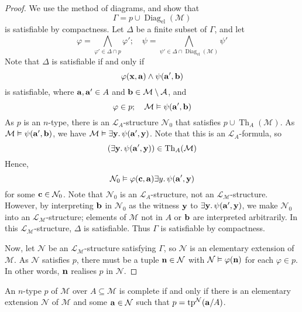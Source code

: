 \begin{proof}
    We use the method of diagrams, and show that
    \[ \Gamma = p \cup \operatorname{Diag}_{\text{el}}(\mathcal M) \]
    is satisfiable by compactness.
    Let \( \Delta \) be a finite subset of \( \Gamma \), and let
    \[ \varphi = \bigwedge_{\varphi' \in \Delta \cap p} \varphi';\quad \psi = \bigwedge_{\psi' \in \Delta \cap \operatorname{Diag}_{\text{el}}(\mathcal M)} \psi' \]
    Note that \( \Delta \) is satisfiable if and only if
    \[ \varphi(\vb x, \vb a) \wedge \psi(\vb a', \vb b) \]
    is satisfiable, where \( \vb a, \vb a' \in A \) and \( \vb b \in \mathcal M \setminus \mathcal A \), and
    \[ \varphi \in p;\quad \mathcal M \vDash \psi(\vb a', \vb b) \]
    As \( p \) is an \( n \)-type, there is an \( \mathcal L_A \)-structure \( \mathcal N_0 \) that satisfies \( p \cup \operatorname{Th}_A(\mathcal M) \).
    As \( \mathcal M \vDash \psi(\vb a', \vb b) \), we have \( \mathcal M \vDash \exists \vb y.\, \psi(\vb a', \vb y) \).
    Note that this is an \( \mathcal L_A \)-formula, so
    \[ (\exists \vb y.\, \psi(\vb a', \vb y)) \in \operatorname{Th}_A(\mathcal M) \]
    Hence,
    \[ \mathcal N_0 \vDash \varphi(\vb c, \vb a) \exists y.\, \psi(\vb a', \vb y) \]
    for some \( \vb c \in \mathcal N_0 \).
    Note that \( \mathcal N_0 \) is an \( \mathcal L_A \)-structure, not an \( \mathcal L_{\mathcal M} \)-structure.
    However, by interpreting \( \vb b \) in \( \mathcal N_0 \) as the witness \( \vb y \) to \( \exists \vb y.\, \psi(\vb a', \vb y) \), we make \( \mathcal N_0 \) into an \( \mathcal L_{\mathcal M} \)-structure; elements of \( \mathcal M \) not in \( A \) or \( \vb b \) are interpreted arbitrarily.
    In this \( \mathcal L_{\mathcal M} \)-structure, \( \Delta \) is satisfiable.
    Thus \( \Gamma \) is satisfiable by compactness.

    Now, let \( \mathcal N \) be an \( \mathcal L_{\mathcal M} \)-structure satisfying \( \Gamma \), so \( \mathcal N \) is an elementary extension of \( \mathcal M \).
    As \( \mathcal N \) satisfies \( p \), there must be a tuple \( \vb n \in \mathcal N \) with \( \mathcal N \vDash \varphi(\vb n) \) for each \( \varphi \in p \).
    In other words, \( \vb n \) realises \( p \) in \( \mathcal N \).
\end{proof}
\begin{corollary}
    An \( n \)-type \( p \) of \( \mathcal M \) over \( A \subseteq \mathcal M \) is complete if and only if there is an elementary extension \( \mathcal N \) of \( \mathcal M \) and some \( \vb a \in \mathcal N \) such that \( p = \operatorname{tp}^{\mathcal N}(\vb a/A) \).
\end{corollary}
